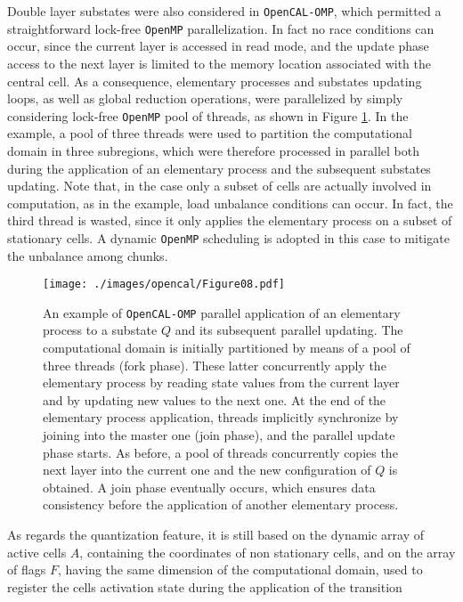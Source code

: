 Double layer substates were also considered in \texttt{OpenCAL-OMP}, which permitted a straightforward lock-free \texttt{OpenMP} parallelization. In fact no race conditions can occur, since the current layer is accessed in read mode, and the update phase access to the next layer is limited to the memory location associated with
the central cell. As a consequence, elementary processes and
substates updating loops, as well as global reduction operations,
were parallelized by simply considering lock-free \texttt{OpenMP} pool of
threads, as shown in Figure \ref{fig:pool_of_threads}. In the
example, a pool of three threads were used to partition the
computational domain in three subregions, which were therefore
processed in parallel both during the application of an elementary
process and the subsequent substates updating. Note that, in the
case only a subset of cells are actually involved in computation, as
in the example, load unbalance conditions can occur. In fact, the
third thread is wasted, since it only applies the elementary process
on a subset of stationary cells. A dynamic \texttt{OpenMP} scheduling is
adopted in this case to mitigate the unbalance among chunks.
\begin{figure}
	\begin{center}
		\texttt{[image: ./images/opencal/Figure08.pdf]}
		\caption{An example of \texttt{OpenCAL-OMP} parallel application of an elementary
			process to a substate $Q$ and its subsequent parallel updating. The
			computational domain is initially partitioned by means of a pool of
			three threads (fork phase). These latter concurrently apply the
			elementary process by reading state values from the current layer and by updating new values to the next one. At the end of the elementary process application, threads implicitly synchronize by joining into the master one (join phase), and the parallel update phase starts. As before, a pool of threads concurrently copies the next layer into the current one and the new configuration of $Q$ is obtained. A join phase eventually occurs, which ensures data consistency before the application of another elementary process.}
		\label{fig:pool_of_threads}
	\end{center}
\end{figure}
As regards the quantization feature, it is still based on the
dynamic array of active cells $A$, containing the coordinates of non
stationary cells, and on the array of flags $F$, having the same
dimension of the computational domain, used to register the cells
activation state during the application of the transition
